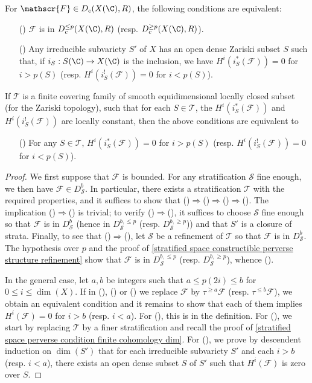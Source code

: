 \begin{proposition}\label{scheme perverse sheaf D^p char}
For $\mathscr{F}\in D_c(X(\C),R)$, the following conditions are equivalent:
\begin{enumerate}
    \item[(\rmnum{1})] $\mathscr{F}$ is in $D_c^{\leq p}(X(\C),R)$ (resp. $D_c^{\geq p}(X(\C),R)$).
    \item[(\rmnum{2})] Any irreducible subvariety $S'$ of $X$ has an open dense Zariski subset $S$ such that, if $i_S:S(\C)\to X(\C)$ is the inclusion, we have $H^i(i_S^*(\mathscr{F}))=0$ for $i>p(S)$ (resp. $H^i(i_S^!(\mathscr{F}))=0$ for $i<p(S)$).
\end{enumerate}
If $\mathcal{T}$ is a finite covering family of smooth equidimensional locally closed subset (for the Zariski topology), such that for each $S\in\mathcal{T}$, the $H^i(i_S^*(\mathscr{F}))$ and $H^i(i_S^!(\mathscr{F}))$ are locally constant, then the above conditions are equivalent to
\begin{enumerate}
    \item[(\rmnum{3})] For any $S\in\mathcal{T}$, $H^i(i_S^*(\mathscr{F}))=0$ for $i>p(S)$ (resp. $H^i(i_S^!(\mathscr{F}))=0$ for $i<p(S)$).
\end{enumerate}
\end{proposition}
\begin{proof}
We first suppose that $\mathscr{F}$ is bounded. For any stratification $\mathcal{S}$ fine enough, we then have $\mathscr{F}\in D^b_\mathcal{S}$. In particular, there exists a stratification $\mathcal{T}$ with the required properties, and it suffices to show that ()$\Rightarrow$()$\Rightarrow$()$\Rightarrow$(). The implication ()$\Rightarrow$() is trivial; to verify ()$\Rightarrow$(), it suffices to choose $\mathcal{S}$ fine enough so that $\mathscr{F}$ is in $D^b_\mathcal{S}$ (hence in $D_\mathcal{S}^{b,\leq p}$ (resp. $D_\mathcal{S}^{b,\geq p}$)) and that $S'$ is a closure of strata. Finally, to see that ()$\Rightarrow$(), let $\mathcal{S}$ be a refinement of $\mathcal{T}$ so that $\mathscr{F}$ is in $D_\mathcal{S}^b$. The hypothesis over $p$ and the proof of \cref{stratified space constructible perverse structure refinement} show that $\mathscr{F}$ is in $D_\mathcal{S}^{b,\leq p}$ (resp. $D_\mathcal{S}^{b,\geq p}$), whence ().\par
In the general case, let $a,b$ be integers such that $a\leq p(2i)\leq b$ for $0\leq i\leq\dim(X)$. If in (), () or () we replace $\mathscr{F}$ by $\tau^{\geq a}\mathscr{F}$ (resp. $\tau^{\leq b}\mathscr{F}$), we obtain an equivalent condition and it remains to show that each of them implies $H^i(\mathscr{F})=0$ for $i>b$ (resp. $i<a$). For (), this is in the definition. For (), we start by replacing $\mathcal{T}$ by a finer stratification and recall the proof of \cref{stratified space perverse condition finite cohomology dim}. For (), we prove by descendent induction on $\dim(S')$ that for each irreducible subvariety $S'$ and each $i>b$ (resp. $i<a$), there exists an open dense subset $S$ of $S'$ such that $H^i(\mathscr{F})$ is zero over $S$.
\end{proof}


